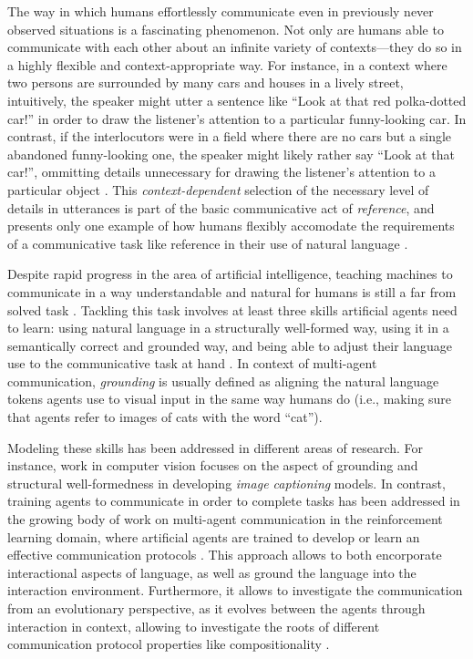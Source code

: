 The way in which humans effortlessly communicate even in previously never observed situations is a fascinating phenomenon. Not only are humans able to communicate with each other about an infinite variety of contexts---they do so in a highly flexible and context-appropriate way. For instance, in a context where two persons are surrounded by many cars and houses in a lively street, intuitively, the speaker might utter a sentence like ``Look at that red polka-dotted car!'' in order to draw the listener's attention to a particular funny-looking car. In contrast, if the interlocutors were in a field where there are no cars but a single abandoned funny-looking one, the speaker might likely rather say ``Look at that car!'', ommitting details unnecessary for drawing the listener's attention to a particular object \parencite[cf.][]{graf2016animal}. This \textit{context-dependent} selection of the necessary level of details in utterances is part of the basic communicative act of \textit{reference}, and presents only one example of how humans flexibly accomodate the requirements of a communicative task like reference in their use of natural language \parencite{searle1969speech, grice1975logic}.

Despite rapid progress in the area of artificial intelligence, teaching machines to communicate in a way understandable and natural for humans is still a far from solved task \parencite{lazaridou2020emergent, lake2017building, lecun2015deep}. Tackling this task involves at least three skills artificial agents need to learn: using natural language in a structurally well-formed way, using it in a semantically correct and grounded way, and being able to adjust their language use to the communicative task at hand \parencite{lazaridou2020emergent}. In context of multi-agent communication, \textit{grounding} is usually defined as aligning the natural language tokens agents use to visual input in the same way humans do (i.e., making sure that agents refer to images of cats with the word ``cat'').

Modeling these skills has been addressed in different areas of research. For instance, work in computer vision focuses on the aspect of grounding and structural well-formedness in developing \textit{image captioning} models.
In contrast, training agents to communicate in order to complete tasks has been addressed in the growing body of work on multi-agent communication in the reinforcement learning domain, where artificial agents are trained to develop or learn an effective communication protocols \parencite{foerster2016learning, lazaridou2020multi}.
This approach allows to both encorporate interactional aspects of language, as well as ground the language into the interaction environment. Furthermore, it allows to investigate the communication from an evolutionary perspective, as it evolves between the agents through interaction in context, allowing to investigate the roots of different communication protocol properties like compositionality \parencite{lazaridou2020emergent}. 

